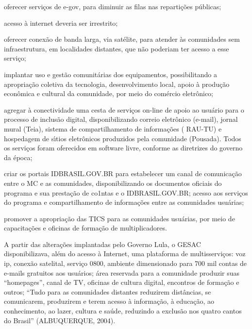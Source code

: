 \documentclass[
12pt,		%
openright,	%
twoside,  %
a4paper,			%
chapter=TITLE,		%
english,			%
french,				%
spanish,			%
brazil				%
]{USPSC-classe/USPSC}
\begin{document}
\begin{alineas}
\item oferecer servi\c{c}os de e-gov, para diminuir as filas nas reparti\c{c}\~oes p\'ublicas;
\item acesso \`a internet deveria ser irrestrito;
\item oferecer conex\~ao de banda larga, via sat\'elite, para atender \`as comunidades sem infraestrutura,  em localidades distantes, que n\~ao poderiam ter acesso a esse servi\c{c}o;
\item implantar uso e gest\~ao comunit\'arias dos equipamentos, possibilitando a apropria\c{c}\~ao coletiva  da tecnologia,  desenvolvimento local, apoio \`a produ\c{c}\~ao econ\^omica e cultural da comunidade, por meio do com\'ercio eletr\^onico;
\item agregar \`a conectividade uma cesta de servi\c{c}os on-line de apoio ao usu\'ario para o processo de inclus\~ao digital, disponibilizando correio eletr\^onico (e-mail),  jornal mural (Teia), sistema de compartilhamento de informa\c{c}\~oes ( RAU-TU) e hospedagem de s\'{\i}tios eletr\^onicos produzidos pela comunidade (Pousada). Todos os servi\c{c}os  foram oferecidos em software livre, conforme as diretrizes do governo da \'epoca;
\item criar  os portais IDBRASIL.GOV.BR para estabelecer um canal de comunica\c{c}\~ao entre o MC e as comunidades, disponibilizando os documentos oficiais do programa e sua presta\c{c}\~ao de co1ntas e o IDBRASIL.GOV.BR; acesso aos servi\c{c}os do programa e compartilhamento  de informa\c{c}\~oes  entre as comunidades usu\'arias;
\item promover a apropria\c{c}\~ao das TICS  para as comunidades usu\'arias, por meio de  capacita\c{c}\~oes e oficinas de forma\c{c}\~ao de multiplicadores.
\end{alineas}

A partir das altera\c{c}\~oes implantadas pelo Governo Lula, o GESAC disponibilizava, al\'em do acesso \`a Internet, uma plataforma de multisservi\c{c}os:  voz ip,  conex\~ao satelital,  servi\c{c}o 0800, ambiente dimensionado para 700 mil contas de e-mails gratuitos aos usu\'arios; \'area reservada para a comunidade produzir suas “homepages”, canal de TV, oficinas de cultura digital, encontros de forma\c{c}\~ao e outros; “Tudo para as comunidades distantes reduzirem dist\^ancias, se comunicarem, produzirem e terem acesso \`a informa\c{c}\~ao, \`a educa\c{c}\~ao, ao conhecimento, ao lazer, cultura e sa\'ude, reduzindo a exclus\~ao nos quatro cantos do Brasil” (ALBUQUERQUE, 2004).
\end{document}

